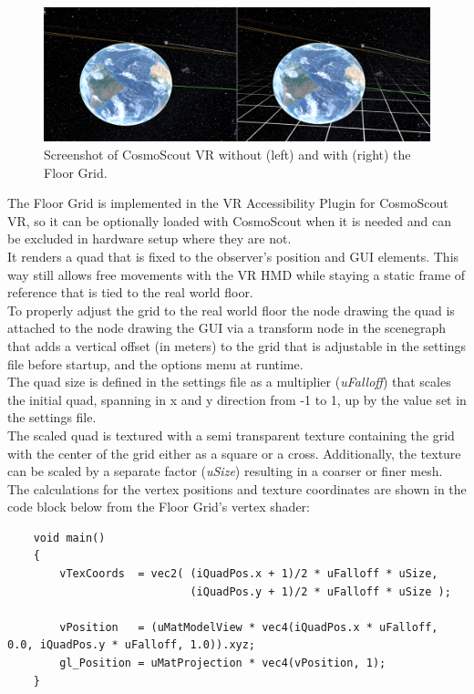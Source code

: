 \begin{figure}[h]
    \centering
    \includegraphics[width=\textwidth]{content/4_1_floorGrid/img/FloorGrid_Screenshot}
    \caption{Screenshot of CosmoScout VR without (left) and with (right) the Floor Grid.}
    \label{fig:floor-grid-screenshot}
\end{figure}
The Floor Grid is implemented in the VR Accessibility Plugin for CosmoScout VR, so it can be optionally loaded with
CosmoScout when it is needed and can be excluded in hardware setup where they are not.
\\
It renders a quad that is fixed to the observer's position and GUI elements.
This way still allows free movements with the VR HMD while staying a static frame of reference that is tied to
the real world floor.
\\
To properly adjust the grid to the real world floor the node drawing the quad is attached to the node drawing the GUI
via a transform node in the scenegraph that adds a vertical offset (in meters) to the grid that is adjustable in the
settings file before startup, and the options menu at runtime.
\\
The quad size is defined in the settings file as a multiplier (\textit{uFalloff}) that scales
the initial quad, spanning in x and y direction from -1 to 1, up by the value set in the settings file.
\\
The scaled quad is textured with a semi transparent texture containing the grid with the center of the grid either as a
square or a cross.
Additionally, the texture can be scaled by a separate factor (\textit{uSize}) resulting in a
coarser or finer mesh.
\\
The calculations for the vertex positions and texture coordinates are shown in the code block below from the Floor
Grid's vertex shader:
\begin{verbatim}
    void main()
    {
        vTexCoords  = vec2( (iQuadPos.x + 1)/2 * uFalloff * uSize,
                            (iQuadPos.y + 1)/2 * uFalloff * uSize );

        vPosition   = (uMatModelView * vec4(iQuadPos.x * uFalloff, 0.0, iQuadPos.y * uFalloff, 1.0)).xyz;
        gl_Position = uMatProjection * vec4(vPosition, 1);
    }
\end{verbatim}
